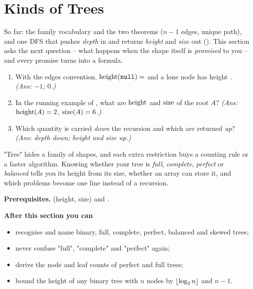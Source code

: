 \section{Kinds of Trees}\label{sec:c01-kinds}

\begin{previouslybox}
So far: the family vocabulary and the two theorems ($n-1$ edges, unique path), and one
DFS that pushes \emph{depth} in and returns \emph{height} and \emph{size} out
(). This section asks the next question -- what happens when the
shape itself is \emph{promised} to you -- and every promise turns into a formula.

\begin{enumerate}[nosep, leftmargin=1.6em]
  \item With the edges convention, $\operatorname{height}(\texttt{null})=$ \underline{\hspace{0.7cm}} and a lone
        node has height \underline{\hspace{0.7cm}}. \emph{(Ans: $-1$; $0$.)}
  \item In the running example of , what are $\operatorname{height}$ and
        $\operatorname{size}$ of the root $A$? \emph{(Ans: $\operatorname{height}(A)=2$, $\operatorname{size}(A)=6$.)}
  \item Which quantity is carried \emph{down} the recursion and which are returned
        \emph{up}? \emph{(Ans: depth down; height and size up.)}
\end{enumerate}
\end{previouslybox}

\begin{topicintro}
"Tree" hides a family of shapes, and each extra restriction buys a counting rule or a
faster algorithm. Knowing whether your tree is \emph{full}, \emph{complete}, \emph{perfect}
or \emph{balanced} tells you its height from its size, whether an array can store it, and
which problems become one line instead of a recursion.

\textbf{Prerequisites.}  (height, size) and .

\textbf{After this section you can}
\begin{itemize}[nosep]
  \item recognise and name binary, full, complete, perfect, balanced and skewed trees;
  \item never confuse "full", "complete" and "perfect" again;
  \item derive the node and leaf counts of perfect and full trees;
  \item bound the height of any binary tree with $n$ nodes by $\lfloor\log_2 n\rfloor$ and $n-1$.
\end{itemize}
\end{topicintro}

